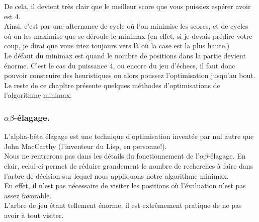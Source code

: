\documentclass[a4paper, 12pt]{article}
\numberwithin{equation}{subsection}
\begin{document}
De cela, il devient très clair que le meilleur score que vous puissiez espérer avoir est 4.\\
Ainsi, c'est par une alternance de cycle où l'on minimise les scores, et de cycles où on les maximise que se déroule le minimax (en effet, si je devais prédire votre coup, je dirai que vous iriez toujours vers là où la case est la plus haute.)\\
Le défaut du minimax est quand le nombre de positions dans la partie devient énorme. C'est le cas du puissance 4, ou encore du jeu d'échecs, il faut donc pouvoir construire des heuristiques ou alors poussez l'optimisation jusqu'au bout.\\Le reste de ce chapître présente quelques méthodes d'optimisations de l'algorithme minimax.\\
\subsubsection{$\alpha\beta$-élagage.}
L'alpha-bêta élagage est une technique d'optimisation inventée par nul autre que John MacCarthy (l'inventeur du Lisp, en personne!).\\
Nous ne rentrerons pas dans les détails du fonctionnement de l'$\alpha\beta$-élagage. En clair, celui-ci permet de réduire grandement le nombre de recherches à faire dans l'arbre de décision sur lequel nous appliquons notre algorithme minimax.\\
En effet, il n'est pas nécessaire de visiter les positions où l'évaluation n'est pas assez favorable.\\
L'arbre de jeu étant tellement énorme, il est extrêmement pratique de ne pas avoir à tout visiter.
\end{document}
